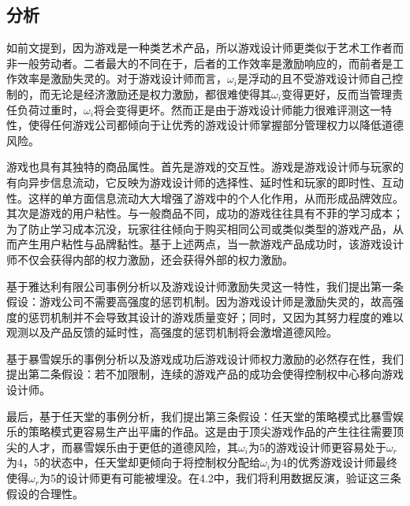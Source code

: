 \documentclass[hyperref]{ctexart}
\begin{document}
\begin{multicols}{2}
	\subsection{分析}
	如前文提到，因为游戏是一种类艺术产品，所以游戏设计师更类似于艺术工作者而非一般劳动者。二者最大的不同在于，后者的工作效率是激励响应的，而前者是工作效率是激励失灵的。对于游戏设计师而言，$\omega_i$是浮动的且不受游戏设计师自己控制的，而无论是经济激励还是权力激励，都很难使得其$\omega_i$变得更好，反而当管理责任负荷过重时，$\omega_i$将会变得更坏。然而正是由于游戏设计师能力很难评测这一特性，使得任何游戏公司都倾向于让优秀的游戏设计师掌握部分管理权力以降低道德风险。\par
	游戏也具有其独特的商品属性。首先是游戏的交互性。游戏是游戏设计师与玩家的有向异步信息流动，它反映为游戏设计师的选择性、延时性和玩家的即时性、互动性。这样的单方面信息流动大大增强了游戏中的个人化作用，从而形成品牌效应。其次是游戏的用户粘性。与一般商品不同，成功的游戏往往具有不菲的学习成本；为了防止学习成本沉没，玩家往往倾向于购买相同公司或类似类型的游戏产品，从而产生用户粘性与品牌黏性。基于上述两点，当一款游戏产品成功时，该游戏设计师不仅会获得内部的权力激励，还会获得外部的权力激励。\par
	基于雅达利有限公司事例分析以及游戏设计师激励失灵这一特性，我们提出第一条假设：游戏公司不需要高强度的惩罚机制。因为游戏设计师是激励失灵的，故高强度的惩罚机制并不会导致其设计的游戏质量变好；同时，又因为其努力程度的难以观测以及产品反馈的延时性，高强度的惩罚机制将会激增道德风险。\par
	基于暴雪娱乐的事例分析以及游戏成功后游戏设计师权力激励的必然存在性，我们提出第二条假设：若不加限制，连续的游戏产品的成功会使得控制权中心移向游戏设计师。\par
	最后，基于任天堂的事例分析，我们提出第三条假设：任天堂的策略模式比暴雪娱乐的策略模式更容易生产出平庸的作品。这是由于顶尖游戏作品的产生往往需要顶尖的人才，而暴雪娱乐由于更低的道德风险，其$\omega_i$为5的游戏设计师更容易处于$\omega_r$为4，5的状态中，任天堂却更倾向于将控制权分配给$\omega_i$为4的优秀游戏设计师最终使得$\omega_r$为5的设计师更有可能被埋没。在4.2中，我们将利用数据反演，验证这三条假设的合理性。

\end{multicols}
\end{document}

